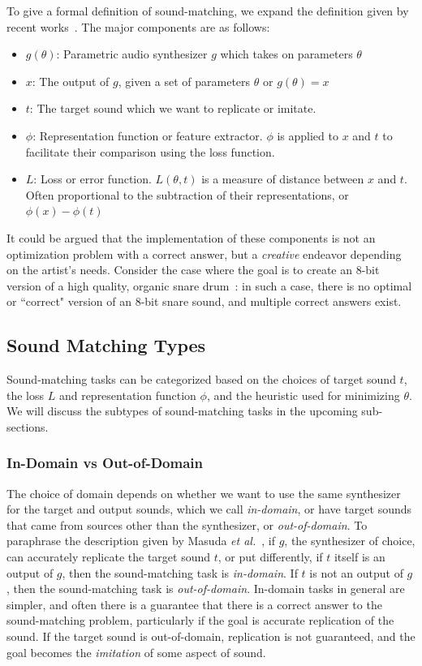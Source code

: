 \documentclass[lettersize,journal]{IEEEtran}
\begin{document}
To give a formal definition of sound-matching, we expand the definition given by recent works~\cite{vahidi2023mesostructures,han2023perceptual}. The major components are as follows: 
\begin{itemize}
    \item $g(\theta)$: Parametric audio synthesizer $g$ which takes on parameters $\theta$ 
    \item $x$: The output of $g$, given a set of parameters $\theta$ or $g(\theta) = x$ 
    \item $t$: The target sound which we want to replicate or imitate. 
    \item $\phi$: Representation function or feature extractor. $\phi$ is applied to $x$ and $t$ to facilitate their comparison using the loss function.
    \item $L$: Loss or error function. $L(\theta,t)$ is a measure of distance between $x$ and $t$. Often proportional to the subtraction of their representations, or $ \phi(x) - \phi(t)$
\end{itemize}

It could be argued that the implementation of these components is not an optimization problem with a correct answer, but a \textit{creative} endeavor depending on the artist's needs. Consider the case where the goal is to create an 8-bit version of a high quality, organic snare drum~\cite{collins2007loop}: in such a case, there is no optimal or ``correct" version of an 8-bit snare sound, and multiple correct answers exist.   

\subsection{Sound Matching Types}
\label{sec:matching_types}

Sound-matching tasks can be categorized based on the choices of target sound $t$, the loss $L$ and representation function $\phi$, and the heuristic used for minimizing $\theta$. We will discuss the subtypes of sound-matching tasks in the upcoming sub-sections.

\subsubsection{In-Domain vs Out-of-Domain}
\label{sec:in-domain}
The choice of domain depends on whether we want to use the same synthesizer for the target and output sounds, which we call \textit{in-domain}, or have target sounds that came from sources other than the synthesizer, or \textit{out-of-domain}. To paraphrase the description given by Masuda \textit{et al.}~\cite{masuda2021soundmatch}, if $g$, the synthesizer of choice, can accurately replicate the target sound $t$, or put differently, if $t$ itself is an output of $g$, then the sound-matching task is \textit{in-domain}. If $t$ is not an output of $g$, then the sound-matching task is \textit{out-of-domain}. In-domain tasks in general are simpler, and often there is a guarantee that there is a correct answer to the sound-matching problem, particularly if the goal is accurate replication of the sound. If the target sound is out-of-domain, replication is not guaranteed, and the goal becomes the \textit{imitation} of some aspect of sound. 
\end{document}
